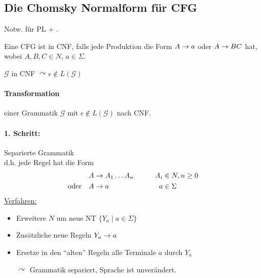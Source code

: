 \subsection{Die Chomsky Normalform für \ac*{CFG}}
Notw. für \ac{PL} + .
\begin{Def}[name={[\acs*{CFG} in \acs*{CNF}]}]
	Eine \ac{CFG} ist in \ac{CNF}, falls jede Produktion die Form $A\->a$ oder $A\->BC$ hat, wobei $A,B,C\in N$, $a\in\Sigma$.
\end{Def}
\begin{Beobachtung}
	$\mathcal{G}$ in \ac{CNF} $\curvearrowright \epsilon \notin L(\mathcal{G})$
\end{Beobachtung}
	
\paragraph*{Transformation} einer Grammatik $\mathcal{G}$ mit $\epsilon\notin L(\mathcal{G})$ nach \ac{CNF}.

\paragraph*{1. Schritt:} Separierte Grammatik\\
d.h. jede Regel hat die Form
\begin{alignat*}{2}
	A&\-> A_1\dots A_n &\qquad A_i&\in N,n\geq 0\\
	\text{oder}\quad A &\-> a & a&\in\Sigma
\end{alignat*}
\uline{Verfahren:}
\begin{itemize}
\item Erweitere $N$ um neue \acs{NT} $\{Y_a \mid a\in\Sigma\}$
\item Zusätzliche neue Regeln $Y_a\-> a$
\item Ersetze in den "`alten"' Regeln alle Terminale $a$ durch $Y_a$
\item[$\curvearrowright$] Grammatik separiert, Sprache ist unverändert.
\end{itemize}

